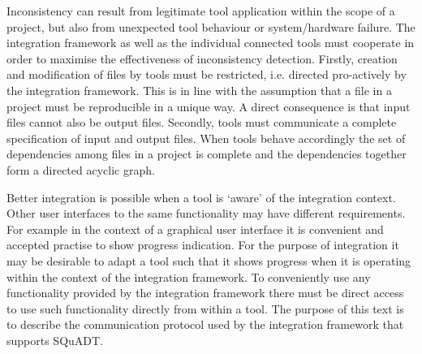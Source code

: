 \documentclass{article}
\newcommand{\squadt}{SQuADT\xspace}
\begin{document}
  Inconsistency can result from legitimate tool application within the scope of
  a project, but also from unexpected tool behaviour or system/hardware
  failure.  The integration framework as well as the individual connected tools
  must cooperate in order to maximise the effectiveness of inconsistency
  detection. Firstly, creation and modification of files by tools must be
  restricted, i.e. directed pro-actively by the integration framework.  This is
  in line with the assumption that a file in a project must be reproducible in
  a unique way. A direct consequence is that input files cannot also be output
  files.  Secondly, tools must communicate a complete specification of input
  and output files.  When tools behave accordingly the set of dependencies
  among files in a project is complete and the dependencies together form a
  directed acyclic graph.
 
  Better integration is possible when a tool is `aware' of the integration
  context. Other user interfaces to the same functionality may have different
  requirements. For example in the context of a graphical user interface it is
  convenient and accepted practise to show progress indication. For the purpose
  of integration it may be desirable to adapt a tool such that it shows
  progress when it is operating within the context of the integration
  framework. To conveniently use any functionality provided by the integration
  framework there must be direct access to use such functionality directly from
  within a tool.  The purpose of this text is to describe the communication
  protocol used by the integration framework that supports \squadt.

\end{document}
